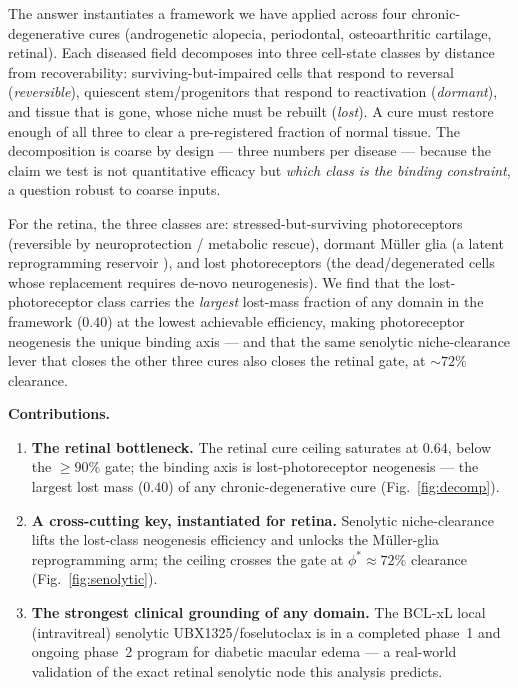 \documentclass[11pt,a4paper]{article}
\begin{document}
The answer instantiates a framework we have applied across four chronic-degenerative cures
(androgenetic alopecia, periodontal, osteoarthritic cartilage, retinal). Each diseased field
decomposes into three cell-state classes by distance from recoverability: surviving-but-impaired
cells that respond to reversal (\emph{reversible}), quiescent stem/progenitors that respond to
reactivation (\emph{dormant}), and tissue that is gone, whose niche must be rebuilt
(\emph{lost}). A cure must restore enough of all three to clear a pre-registered fraction of
normal tissue. The decomposition is coarse by design --- three numbers per disease --- because
the claim we test is not quantitative efficacy but \emph{which class is the binding constraint},
a question robust to coarse inputs.

For the retina, the three classes are: stressed-but-surviving photoreceptors (reversible by
neuroprotection / metabolic rescue), dormant M\"uller glia (a latent reprogramming reservoir
\citep{goldman2014,jorstad2017,yao2018}), and lost photoreceptors (the dead/degenerated cells
whose replacement requires de-novo neurogenesis). We find that the lost-photoreceptor class
carries the \emph{largest} lost-mass fraction of any domain in the framework ($0.40$) at the
lowest achievable efficiency, making photoreceptor neogenesis the unique binding axis --- and
that the same senolytic niche-clearance lever that closes the other three cures also closes the
retinal gate, at ${\sim}72\%$ clearance.

\medskip\noindent\textbf{Contributions.}
\begin{enumerate}\itemsep0.3em
\item \textbf{The retinal bottleneck.} The retinal cure ceiling saturates at $0.64$, below the
$\geq 90\%$ gate; the binding axis is lost-photoreceptor neogenesis --- the largest lost mass
($0.40$) of any chronic-degenerative cure (Fig.~\ref{fig:decomp}).
\item \textbf{A cross-cutting key, instantiated for retina.} Senolytic niche-clearance lifts the
lost-class neogenesis efficiency and unlocks the M\"uller-glia reprogramming arm; the ceiling
crosses the gate at $\phi^\ast\!\approx\!72\%$ clearance (Fig.~\ref{fig:senolytic}).
\item \textbf{The strongest clinical grounding of any domain.} The BCL-xL local (intravitreal)
senolytic UBX1325/foselutoclax is in a completed phase~1 and ongoing phase~2 program for
diabetic macular edema \citep{crespodawid2024,crespogarcia2021} --- a real-world validation of
the exact retinal senolytic node this analysis predicts.
\end{enumerate}
\end{document}
